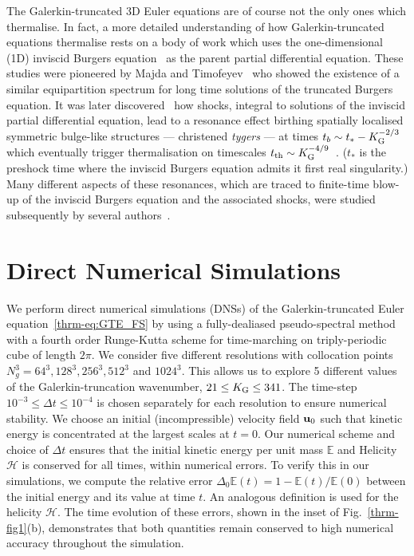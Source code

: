 \documentclass[../Rajarshi-thesis-draft.tex]{subfiles}
\begin{document}
The Galerkin-truncated 3D Euler equations are of course not the only ones which
thermalise. In fact, a more detailed understanding of how Galerkin-truncated
equations thermalise rests on a body of work which uses the one-dimensional
(1D) inviscid Burgers equation~\cite{Burgers1948} as the parent partial
differential equation. These studies were pioneered by Majda and
Timofeyev~\cite{MajdaTimofeyev2000} who showed the existence of a similar
equipartition spectrum for long time solutions of the truncated Burgers equation.
It was later discovered~\cite{RayetalTygers2011} how
shocks, integral to solutions of the inviscid partial differential equation,
lead to a resonance effect birthing spatially localised symmetric bulge-like
structures  --- christened \textit{tygers} --- at times $t_b \sim t_* - K_{\rm
G}^{-2/3}$ which eventually trigger thermalisation on timescales $t_{\rm th}
\sim K_{\rm G}^{-4/9}$~\cite{VenkataramanRay}.  ($t_*$ is the preshock time
where the inviscid Burgers equation admits it first real singularity.) Many
different aspects of these resonances, which are traced to finite-time blow-up
of the inviscid Burgers equation and the associated shocks, were studied
subsequently by several
authors~\cite{Pereiraetal2013,Leonietal2018,BrachetReview2022,Cartesetal2022,Kolluruetal2022,MKV2022}.

\section{Direct Numerical Simulations}

We perform direct numerical simulations (DNSs) of the Galerkin-truncated Euler
equation~\eqref{thrm-eq:GTE_FS} by using a fully-dealiased pseudo-spectral method
with a fourth order Runge-Kutta scheme for time-marching on triply-periodic
cube of length  $2\pi$. We consider five different resolutions with
collocation points $N_g^3 = 64^3, 128^3, 256^3, 512^3$ and $1024^3$. This allows us to
explore 5 different values of the Galerkin-truncation wavenumber, $21 \le
K_{\rm G} \le 341$. The time-step $10^{-3} \le \Delta t \le 10^{-4}$
is chosen separately for each resolution to ensure numerical stability. We choose an
initial (incompressible) velocity field ${\bf u}_0$ such that kinetic energy is concentrated at the
largest scales at $t = 0$. Our numerical scheme and choice of $\Delta t$ ensures that the
initial kinetic energy per unit mass $\mathbb{E}$ and Helicity $\mathcal{H}$ is conserved for all times, within numerical errors. {To verify this in our simulations, we compute the relative error
$\Delta_0\mathbb{E}(t)=1-\mathbb{E}(t)/\mathbb{E}(0)$ between the initial energy and its value at
time $t$. An analogous definition is used for the helicity
$\mathcal{H}$. The time evolution of these errors, shown in the inset of
Fig.~\ref{thrm-fig1}(b), demonstrates that both quantities remain
conserved to high numerical accuracy throughout the simulation.}
\end{document}
